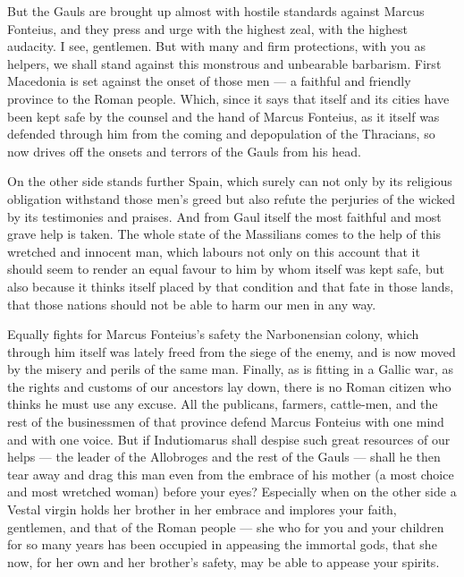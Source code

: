  But the Gauls are brought up almost with hostile standards against Marcus Fonteius, and they press and urge with the highest zeal, with the highest audacity. I see, gentlemen. But with many and firm protections, with you as helpers, we shall stand against this monstrous and unbearable barbarism. First Macedonia is set against the onset of those men --- a faithful and friendly province to the Roman people. Which, since it says that itself and its cities have been kept safe by the counsel and the hand of Marcus Fonteius, as it itself was defended through him from the coming and depopulation of the Thracians, so now drives off the onsets and terrors of the Gauls from his head.

 On the other side stands further Spain, which surely can not only by its religious obligation withstand those men's greed but also refute the perjuries of the wicked by its testimonies and praises. And from Gaul itself the most faithful and most grave help is taken. The whole state of the Massilians comes to the help of this wretched and innocent man, which labours not only on this account that it should seem to render an equal favour to him by whom itself was kept safe, but also because it thinks itself placed by that condition and that fate in those lands, that those nations should not be able to harm our men in any way.

 Equally fights for Marcus Fonteius's safety the Narbonensian colony, which through him itself was lately freed from the siege of the enemy, and is now moved by the misery and perils of the same man. Finally, as is fitting in a Gallic war, as the rights and customs of our ancestors lay down, there is no Roman citizen who thinks he must use any excuse. All the publicans, farmers, cattle-men, and the rest of the businessmen of that province defend Marcus Fonteius with one mind and with one voice. But if Indutiomarus shall despise such great resources of our helps --- the leader of the Allobroges and the rest of the Gauls --- shall he then tear away and drag this man even from the embrace of his mother (a most choice and most wretched woman) before your eyes? Especially when on the other side a Vestal virgin holds her brother in her embrace and implores your faith, gentlemen, and that of the Roman people --- she who for you and your children for so many years has been occupied in appeasing the immortal gods, that she now, for her own and her brother's safety, may be able to appease your spirits.

